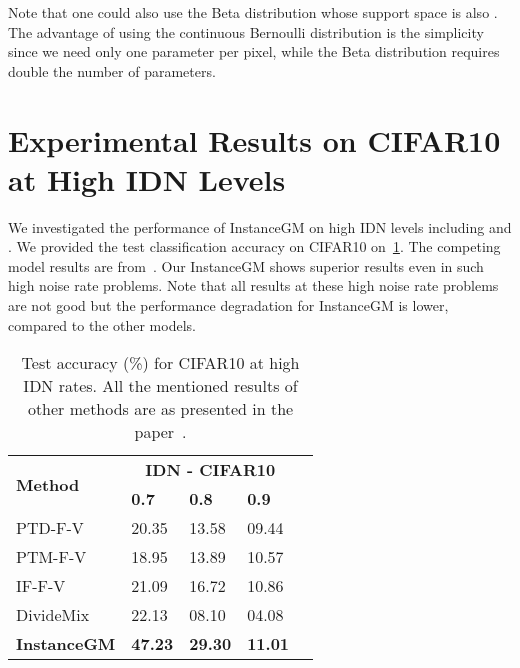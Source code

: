 \documentclass[10pt,twocolumn,letterpaper]{article}
\begin{document}
        
        Note that one could also use the Beta distribution whose support space is also . The advantage of using the continuous Bernoulli distribution is the simplicity since we need only one parameter per pixel, while the Beta distribution requires double the number of parameters.




















\section{Experimental Results on CIFAR10 at High IDN Levels}\label{sec:additional_test}
We investigated the performance of InstanceGM on high IDN levels including  and . We provided the test classification accuracy on CIFAR10 on~\cref{table:high_cifar}. The competing model results are from~\cite{jiang2021information}. Our InstanceGM shows superior results even in such high noise rate problems. Note that all results at these high noise rate problems are not good but the performance degradation for InstanceGM is lower, compared to the other models.

\begin{table}[h]
        \centering
        \caption{
        Test accuracy (\%) for CIFAR10 at high IDN rates. All the mentioned results of other methods are as presented in the paper~\cite{jiang2021information}. 
}
        \label{table:high_cifar}
        \begin{tabular}{l p{3em} p{3em} p{3em} l}
            \toprule
            \multirow{2}{*}{\bfseries Method} & \multicolumn{3}{c}{\bfseries IDN - CIFAR10} \\
            \cmidrule{2-4}
            & \bfseries 0.7 & \bfseries 0.8 & \bfseries 0.9 \\
            \midrule
PTD-F-V~\cite{xia2020part} & 20.35 & 13.58 & 09.44\\
PTM-F-V~\cite{jiang2021information} & 18.95 & 13.89 & 10.57\\
IF-F-V~\cite{jiang2021information} & 21.09 & 16.72 & 10.86\\
            DivideMix~\cite{li2020dividemix} & 22.13 & 08.10 & 04.08\\
            \midrule
            \rowcolor{Gray!25} \textbf{InstanceGM}  & \textbf{47.23} & \textbf{29.30} & \textbf{11.01}\\ \bottomrule
        \end{tabular}
    \end{table}







%
 
\end{document}
